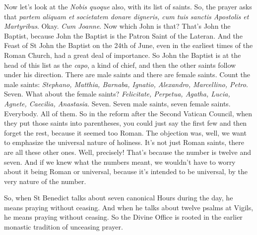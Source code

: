 Now let's look at the \emph{Nobis quoque} also, with its list of saints. So, the prayer asks that \emph{partem aliquam et societatem donare digneris, cum tuis sanctis Apostolis et Martyribus}. Okay. \emph{Cum Joanne}. Now which John is that? That's John the Baptist, because John the Baptist is the Patron Saint of the Lateran. And the Feast of St John the Baptist on the 24th of June, even in the earliest times of the Roman Church, had a great deal of importance. So John the Baptist is at the head of this list as the \emph{capo}, a kind of chief, and then the other saints follow under his direction. There are male saints and there are female saints. Count the male saints: \emph{Stephano, Matthia, Barnaba, Ignatio, Alexandro, Marcellino, Petro}. Seven. What about the female saints? \emph{Felicitate, Perpetua, Agatha, Lucia, Agnete, Caecilia, Anastasia}. Seven. Seven male saints, seven female saints. Everybody. All of them. So in the reform after the Second Vatican Council, when they put those saints into parentheses, you could just say the first few and then forget the rest, because it seemed too Roman. The objection was, well, we want to emphasize the universal nature of holiness. It's not just Roman saints, there are all these other ones. Well, precisely! That's because the number is twelve and seven. And if we knew what the numbers meant, we wouldn't have to worry about it being Roman or universal, because it's intended to be universal, by the very nature of the number.

So, when St Benedict talks about seven canonical Hours during the day, he means praying without ceasing. And when he talks about twelve psalms at Vigils, he means praying without ceasing. So the Divine Office is rooted in the earlier monastic tradition of unceasing prayer.

